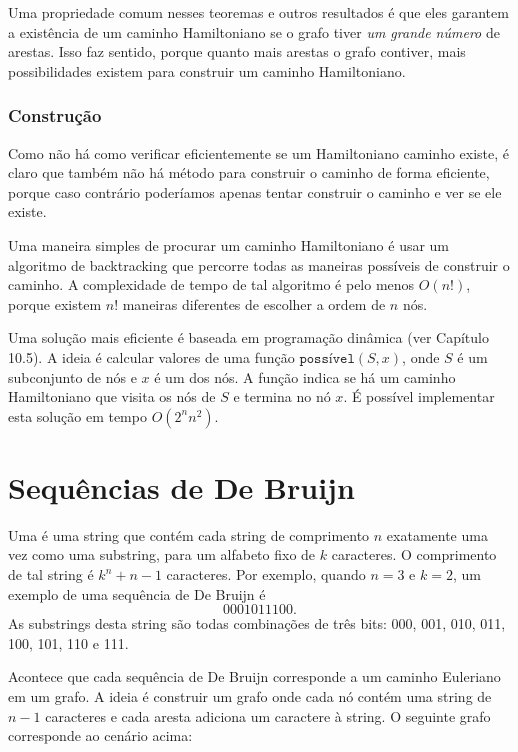 Uma propriedade comum nesses teoremas e outros resultados é
que eles garantem a existência de um caminho Hamiltoniano
se o grafo tiver \emph{um grande número} de arestas.
Isso faz sentido, porque quanto mais arestas o grafo contiver,
mais possibilidades existem para construir um caminho Hamiltoniano.

\subsubsection{Construção}

Como não há como verificar eficientemente se um Hamiltoniano
caminho existe, é claro que também não há método
para construir o caminho de forma eficiente, porque caso contrário
poderíamos apenas tentar construir o caminho e ver
se ele existe.

Uma maneira simples de procurar um caminho Hamiltoniano é
usar um algoritmo de backtracking que percorre todas
as maneiras possíveis de construir o caminho.
A complexidade de tempo de tal algoritmo é pelo menos $O(n!)$,
porque existem $n!$ maneiras diferentes de escolher a ordem de $n$ nós.

Uma solução mais eficiente é baseada em programação dinâmica
(ver Capítulo 10.5).
A ideia é calcular valores
de uma função $\texttt{possível}(S,x)$,
onde $S$ é um subconjunto de nós e $x$
é um dos nós.
A função indica se há um caminho Hamiltoniano
que visita os nós de $S$ e termina no nó $x$.
É possível implementar esta solução em tempo $O(2^n n^2)$.

\section{Sequências de De Bruijn}


Uma 
é uma string que contém
cada string de comprimento $n$
exatamente uma vez como uma substring, para um
alfabeto fixo de $k$ caracteres.
O comprimento de tal string é
$k^n+n-1$ caracteres.
Por exemplo, quando $n=3$ e $k=2$,
um exemplo de uma sequência de De Bruijn é
\[0001011100.\]
As substrings desta string são todas
combinações de três bits:
000, 001, 010, 011, 100, 101, 110 e 111.

Acontece que cada sequência de De Bruijn
corresponde a um caminho Euleriano em um grafo.
A ideia é construir um grafo onde
cada nó contém uma string de $n-1$ caracteres
e cada aresta adiciona um caractere à string.
O seguinte grafo corresponde ao cenário acima:


